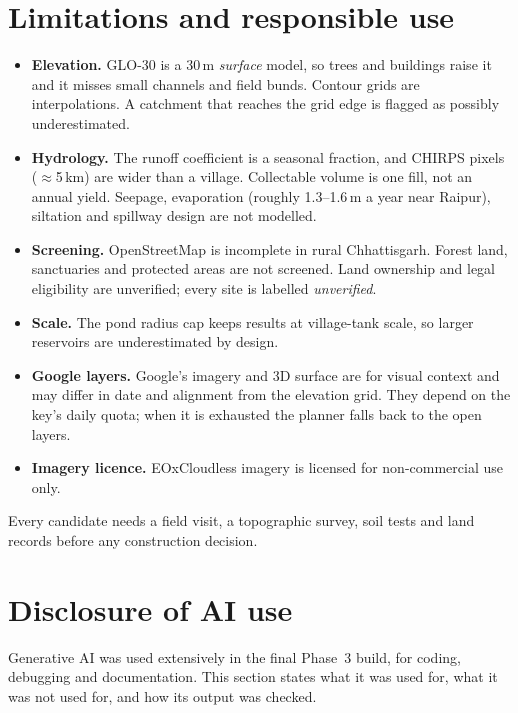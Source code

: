\documentclass[11pt,a4paper]{article}
\begin{document}
\section{Limitations and responsible use}
\begin{itemize}
\item \textbf{Elevation.} GLO-30 is a 30\,m \emph{surface} model, so trees and buildings raise it and it misses small channels and field bunds. Contour grids are interpolations. A catchment that reaches the grid edge is flagged as possibly underestimated.
\item \textbf{Hydrology.} The runoff coefficient is a seasonal fraction, and CHIRPS pixels ($\approx$5\,km) are wider than a village. Collectable volume is one fill, not an annual yield. Seepage, evaporation (roughly 1.3--1.6\,m a year near Raipur), siltation and spillway design are not modelled.
\item \textbf{Screening.} OpenStreetMap is incomplete in rural Chhattisgarh. Forest land, sanctuaries and protected areas are not screened. Land ownership and legal eligibility are unverified; every site is labelled \emph{unverified}.
\item \textbf{Scale.} The pond radius cap keeps results at village-tank scale, so larger reservoirs are underestimated by design.
\item \textbf{Google layers.} Google's imagery and 3D surface are for visual context and may differ in date and alignment from the elevation grid. They depend on the key's daily quota; when it is exhausted the planner falls back to the open layers.
\item \textbf{Imagery licence.} EOxCloudless imagery is licensed for non-commercial use only.
\end{itemize}
Every candidate needs a field visit, a topographic survey, soil tests and land records before any construction decision.

\section{Disclosure of AI use}
\label{sec:ai}
Generative AI was used extensively in the final Phase~3 build, for coding, debugging and documentation. This section states what it was used for, what it was not used for, and how its output was checked.
\end{document}
